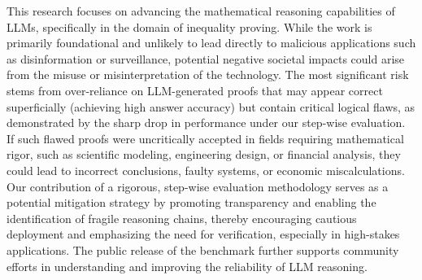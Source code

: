 This research focuses on advancing the mathematical reasoning capabilities of LLMs, specifically in the domain of inequality proving. While the work is primarily foundational and unlikely to lead directly to malicious applications such as disinformation or surveillance, potential negative societal impacts could arise from the misuse or misinterpretation of the technology. The most significant risk stems from over-reliance on LLM-generated proofs that may appear correct superficially (achieving high answer accuracy) but contain critical logical flaws, as demonstrated by the sharp drop in performance under our step-wise evaluation. If such flawed proofs were uncritically accepted in fields requiring mathematical rigor, such as scientific modeling, engineering design, or financial analysis, they could lead to incorrect conclusions, faulty systems, or economic miscalculations. Our contribution of a rigorous, step-wise evaluation methodology serves as a potential mitigation strategy by promoting transparency and enabling the identification of fragile reasoning chains, thereby encouraging cautious deployment and emphasizing the need for verification, especially in high-stakes applications. The public release of the \dataset benchmark further supports community efforts in understanding and improving the reliability of LLM reasoning.
